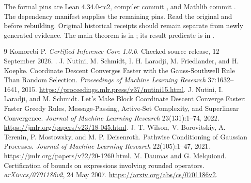The formal pins are Lean 4.34.0-rc2, compiler commit
, and Mathlib commit
.
The dependency manifest supplies the remaining pins. Read the original  and  before rebuilding. Original historical receipts should remain separate from newly generated evidence. The main theorem is in ; its result predicate is in .

\clearpage
\begin{thebibliography}{9}
 Komorebi P. \emph{Certified Inference Core 1.0.0}. Checked source release, 12 September 2026. .
 J. Nutini, M. Schmidt, I. H. Laradji, M. Friedlander, and H. Koepke. Coordinate Descent Converges Faster with the Gauss-Southwell Rule Than Random Selection. \emph{Proceedings of Machine Learning Research} 37:1632--1641, 2015. \url{https://proceedings.mlr.press/v37/nutini15.html}.
 J. Nutini, I. Laradji, and M. Schmidt. Let's Make Block Coordinate Descent Converge Faster: Faster Greedy Rules, Message-Passing, Active-Set Complexity, and Superlinear Convergence. \emph{Journal of Machine Learning Research} 23(131):1--74, 2022. \url{https://jmlr.org/papers/v23/18-045.html}.
 J. T. Wilson, V. Borovitskiy, A. Terenin, P. Mostowsky, and M. P. Deisenroth. Pathwise Conditioning of Gaussian Processes. \emph{Journal of Machine Learning Research} 22(105):1--47, 2021. \url{https://jmlr.org/papers/v22/20-1260.html}.
 M. Daumas and G. Melquiond. Certification of bounds on expressions involving rounded operators. \emph{arXiv:cs/0701186v2}, 24 May 2007. \url{https://arxiv.org/abs/cs/0701186v2}.
\end{thebibliography}
